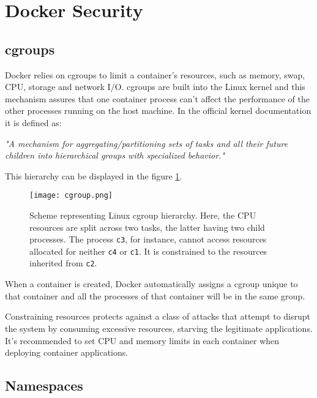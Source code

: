 \section{Docker Security}
\label{sec::security}


\subsection{cgroups}
\label{ssec::security:cgroups}

Docker relies on cgroups to limit a container's resources, such as memory, swap, \acs{CPU}, storage and network I/O. cgroups are built into the Linux kernel and this mechanism assures that one container process can't affect the performance of the other processes running on the host machine. In the official kernel documentation it is defined as:
\begin{displayquote}
    \textit{"A mechanism for aggregating/partitioning sets of tasks and all their future children into hierarchical groups with specialized behavior."}
\end{displayquote}
This hierarchy can be displayed in the figure \ref{fig:cgroup-hch}.

\begin{figure}[!htb]
    \centering
    \texttt{[image: cgroup.png]}
    \caption{Scheme representing Linux cgroup hierarchy\cite{fig-src:cgroups}. Here, the \acs{CPU} resources are split across two tasks, the latter having two child processes. The process \texttt{c3}, for instance, cannot access resources allocated for neither \texttt{c4} or \texttt{c1}. It is constrained to the resources inherited from \texttt{c2}.}
    \label{fig:cgroup-hch}
\end{figure}

When a container is created, Docker automatically assigns a cgroup unique to that container and all the processes of that container will be in the same group.

Constraining resources protects against a class of attacks that attempt to disrupt the system by consuming excessive resources, starving the legitimate applications. It's recommended to set CPU and memory limits in each container when deploying container applications.


\subsection{Namespaces}
\label{ssec::security:namespaces}

